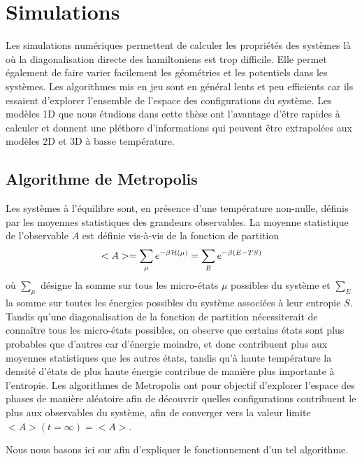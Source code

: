 \chapter{Simulations}
\label{chap-sim}

Les simulations numériques permettent de calculer les propriétés des systèmes là où la diagonalisation directe des hamiltoniens est trop difficile. Elle permet également de faire varier facilement les géométries et les potentiels dans les systèmes. Les algorithmes mis en jeu sont en général lents et peu efficients car ils essaient d'explorer l'ensemble de l'espace des configurations du système. Les modèles 1D que nous étudions dans cette thèse ont l'avantage d'être rapides à calculer et donnent une pléthore d'informations qui peuvent être extrapolées aux modèles 2D et 3D à basse température. 

\section{Algorithme de Metropolis}

Les systèmes à l'équilibre sont, en présence d'une température non-nulle, définis par les moyennes statistiques des grandeurs observables. La moyenne statistique de l'observable $A$ est définie vis-à-vis de la fonction de partition 
\begin{align}
	<A> = \sum_\mu e^{-\beta \mathcal{H}(\mu)} = \sum_E e^{-\beta(E-T S)}
\end{align}
où $\sum_\mu$ désigne la somme sur tous les micro-états $\mu$ possibles du système et $\sum_E$ la somme sur toutes les énergies possibles du système associées à leur entropie $S$. Tandis qu'une diagonalisation de la fonction de partition nécessiterait de connaître tous les micro-états possibles, on observe que certains états sont plus probables que d'autres car d'énergie moindre, et donc contribuent plus aux moyennes statistiques que les autres états, tandis qu'à haute température la densité d'états de plus haute énergie contribue de manière plus importante à l'entropie.
Les algorithmes de Metropolis ont pour objectif d'explorer l'espace des phases de manière aléatoire afin de découvrir quelles configurations contribuent le plus aux observables du système, afin de converger vers la valeur limite $<A>(t=\infty) = <A>$.

Nous nous basons ici sur \cite{newman_monte_1999} afin d'expliquer le fonctionnement d'un tel algorithme.

